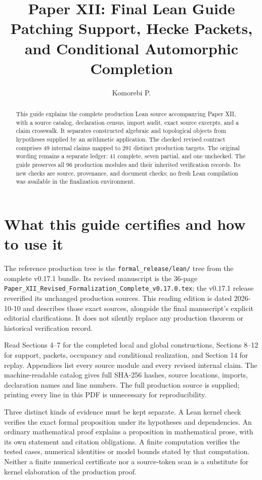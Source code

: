 \documentclass[11pt]{article}
\title{Paper XII: Final Lean Guide\\\large Patching Support, Hecke Packets, and Conditional Automorphic Completion}
\author{Komorebi P.}\date{}
\newcommand{\code}[1]{\nolinkurl{#1}}
\begin{document}
\KomorebiCover


\relax
\begin{abstract}
This guide explains the complete production Lean source accompanying Paper XII, with a source catalog, declaration census, import audit, exact source excerpts, and a claim crosswalk. It separates constructed algebraic and topological objects from hypotheses supplied by an arithmetic application. The checked revised contract comprises 49 internal claims mapped to 291 distinct production targets. The original wording remains a separate ledger: 41 complete, seven partial, and one unchecked. The guide preserves all 96 production modules and their inherited verification records. Its new checks are source, provenance, and document checks; no fresh Lean compilation was available in the finalization environment.
\end{abstract}
{\setlength{\parskip}{0pt}\linespread{1.0}\selectfont\tableofcontents}
\newpage

\section{What this guide certifies and how to use it}
The reference production tree is the \code{formal_release/lean/} tree from the complete v0.17.1 bundle. Its revised manuscript is the 36-page \code{Paper_XII_Revised_Formalization_Complete_v0.17.0.tex}; the v0.17.1 release reverified its unchanged production sources. This reading edition is dated 2026-10-10 and describes those exact sources, alongside the final manuscript's explicit editorial clarifications. It does not silently replace any production theorem or historical verification record.

Read Sections 4--7 for the completed local and global constructions, Sections 8--12 for support, packets, occupancy and conditional realization, and Section 14 for replay. Appendices list every source module and every revised internal claim. The machine-readable catalog gives full SHA-256 hashes, source locations, imports, declaration names and line numbers. The full production source is supplied; printing every line in this PDF is unnecessary for reproducibility.

Three distinct kinds of evidence must be kept separate. A Lean kernel check verifies the exact formal proposition under its hypotheses and dependencies. An ordinary mathematical proof explains a proposition in mathematical prose, with its own statement and citation obligations. A finite computation verifies the tested cases, numerical identities or model bounds stated by that computation. Neither a finite numerical certificate nor a source-token scan is a substitute for kernel elaboration of the production proof.
\end{document}
